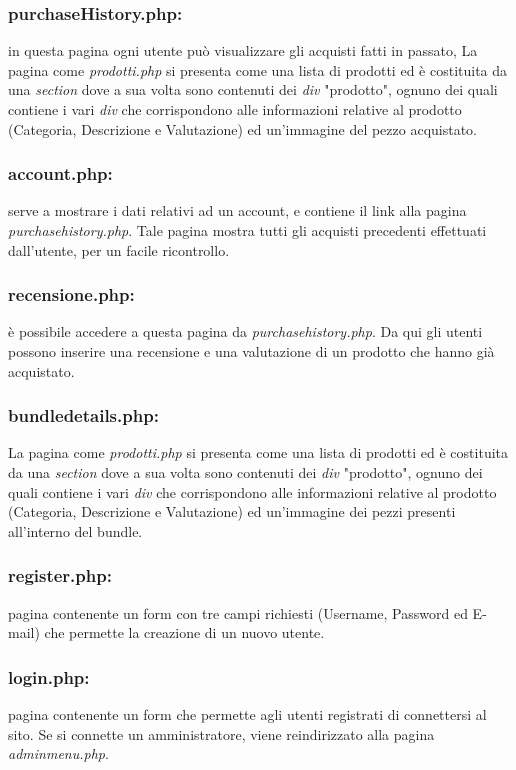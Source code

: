 \subsubsection{purchaseHistory.php:} \Spazio
in questa pagina ogni utente può visualizzare gli acquisti fatti in passato, La pagina come \emph{prodotti.php} si presenta come una lista di prodotti ed è costituita da una \emph{section} dove a sua volta sono contenuti dei \emph{div} "prodotto", ognuno dei quali contiene i vari \emph{div} che corrispondono alle informazioni relative al prodotto (Categoria, Descrizione e Valutazione) ed un'immagine del pezzo acquistato.

\subsubsection{account.php:} \Spazio serve a mostrare i dati relativi ad un account, e contiene il link alla pagina \textit{purchasehistory.php}.
Tale pagina mostra tutti gli acquisti precedenti effettuati dall'utente, per un facile ricontrollo.

\subsubsection{recensione.php:} \Spazio è possibile accedere a questa pagina da \textit{purchasehistory.php}. Da qui gli utenti possono inserire una recensione e una valutazione di un prodotto che hanno già acquistato.

\subsubsection{bundledetails.php:} \Spazio 
La pagina come \emph{prodotti.php} si presenta come una lista di prodotti ed è costituita da una \emph{section} dove a sua volta sono contenuti dei \emph{div} "prodotto", ognuno dei quali contiene i vari \emph{div} che corrispondono alle informazioni relative al prodotto (Categoria, Descrizione e Valutazione) ed un'immagine dei pezzi presenti all'interno del bundle.

\subsubsection{register.php:} \Spazio pagina contenente un form con tre campi richiesti (Username, Password ed E-mail) che permette la creazione di un nuovo utente.

\subsubsection{login.php:} \Spazio pagina contenente un form che permette agli utenti registrati di connettersi al sito. Se si connette un amministratore, viene reindirizzato alla pagina \textit{adminmenu.php}.

